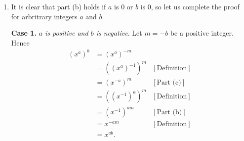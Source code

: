 \begin{enumerate}
\begin{enumerate}
               Thus \eqref{1_1_19_2} holds for each integer $m$. Finally, we
               will show by induction on $n$ that
               $x^{a - n} = x^ax^{-n}$. Equality \eqref{1_1_19_2} says that our 
               statement holds for $n = 1$. So assume that
               $x^{a - k} = x^ax^{-k}$ for some positive integer $k$. Thus
               \begin{align*}
                  x^{a - (k+1)} &= x^{(a - k) - 1}  \\
                             &= x^{a-k}x^{-1} &\text{[\eqref{1_1_19_2}]} \\
                             &= x^ax^{-k}x^{-1} &\text{[Inductive Hypothesis]}\\
                             &= x^a(x^{-1})^kx^{-1}&\text{[Definition]} \\
                             &= x^a(x^{-1})^{k+1} &\text{[Definition]} \\
                             &= x^ax^{-(k+1)}, &\text{[Definition]} \\
               \end{align*}
               so that $x^{a - n} = x^ax^{-n}$ holds for each positive integer
               $n$ by induction; particularly,
               $$x^{a + b} = x^{a - s} = x^ax^{-s} = x^ax^b,$$
               where $s = -b$ (i.e., $s$ is positive). We have thus shown that
               \eqref{1_1_19_1} holds for all integers $a$ and $b$. \qed
         \item It is clear that part (b) holds if $a$ is 0 or $b$ is 0, so let
               us complete the proof for arbritrary integers $a$ and $b$.

               \textbf{Case 1.} \textit{$a$ is positive and $b$ is negative}. 
               Let $m = -b$ be a positive integer. Hence
               \begin{align*}
                  (x^a)^b &= (x^a)^{-m} \\
                          &= ((x^a)^{-1})^m &[\text{Definition}] \\
                          &= (x^{-a})^m &[\text{Part (c)}] \\
                          &= ((x^{-1})^a)^m &[\text{Definition}] \\
                          &= (x^{-1})^{am} &[\text{Part (b)}] \\
                          &= x^{-am} &[\text{Definition}] \\
                          &= x^{ab}.
               \end{align*}


\end{enumerate}
\end{enumerate}
